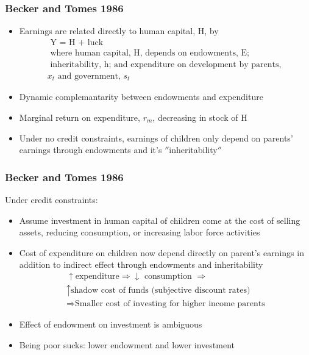 \documentclass{beamer}
\begin{document}

\begin{frame}
\frametitle{Becker and Tomes 1986}
\begin{itemize}
\item Earnings are related directly to human capital, H, by 
\begin{gather*}
\text{ Y = H + luck } \\
\text{ where human capital, H, depends on endowments,  E;} \\
\text{ inheritability, h; and expenditure on development by parents, } \\
 x_{t} \text{ and government, } s_{t}  
\end{gather*}

\item Dynamic complemantarity between endowments and expenditure
\item Marginal return on expenditure, $r_{m}$, decreasing in stock of H

\item Under no credit constraints, earnings of children only depend on parents' earnings through endowments and it's $''$inheritability$''$

\end{itemize}
\end{frame}


\begin{frame}
\frametitle{Becker and Tomes 1986}
Under credit constraints:  \\
\begin{itemize}
\item Assume investment in human capital of children come at the cost of selling assets, reducing consumption, or increasing labor force activities

\item Cost of expenditure on children now depend directly on parent's earnings in addition to indirect effect through endowments and inheritability 
\begin{align*}
\uparrow \text{expenditure}  \Rightarrow \downarrow \text{ consumption } \Rightarrow  \\
 \uparrow \text{shadow cost of funds (subjective discount rates)} \\
\Rightarrow \text{Smaller cost of investing for higher income parents} 
\end{align*}

\item Effect of endowment on investment is ambiguous
\item Being poor sucks: lower endowment and lower investment
\end{itemize}
\end{frame}
\end{document}
